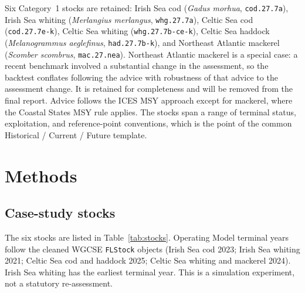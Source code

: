 \documentclass[11pt,a4paper]{article}
\begin{document}
Six Category~1 stocks are retained: Irish Sea cod
(\emph{Gadus morhua}, \texttt{cod.27.7a}), Irish Sea whiting
(\emph{Merlangius merlangus}, \texttt{whg.27.7a}), Celtic Sea cod
(\texttt{cod.27.7e-k}), Celtic Sea whiting
(\texttt{whg.27.7b-ce-k}), Celtic Sea haddock
(\emph{Melanogrammus aeglefinus}, \texttt{had.27.7b-k}), and Northeast
Atlantic mackerel (\emph{Scomber scombrus}, \texttt{mac.27.nea}).
Northeast Atlantic mackerel is a special case: a recent benchmark
involved a substantial change in the assessment, so the backtest
conflates following the advice with robustness of that advice to the
assessment change. It is retained for completeness and will be removed
from the final report. Advice
follows the ICES MSY approach except for mackerel, where the Coastal
States MSY rule applies. The stocks span a range of terminal status,
exploitation, and reference-point conventions, which is the point of the
common Historical / Current / Future template.

\section{Methods}
\label{sec:methods}

\subsection{Case-study stocks}
\label{sec:stocks}

The six stocks are listed in Table~\ref{tab:stocks}. Operating Model
terminal years follow the cleaned WGCSE \texttt{FLStock} objects
(Irish Sea cod 2023; Irish Sea whiting 2021; Celtic Sea cod and haddock
2025; Celtic Sea whiting and mackerel 2024). Irish Sea whiting has the
earliest terminal year. This is a simulation experiment, not a
statutory re-assessment.
\end{document}

